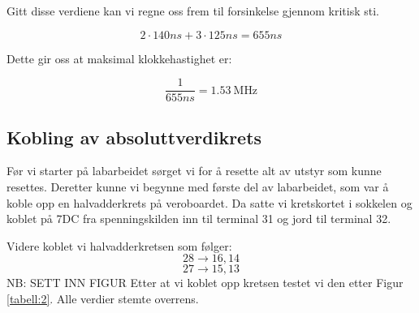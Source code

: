Gitt disse verdiene kan vi regne oss frem til forsinkelse gjennom kritisk sti.

\begin{displaymath}
  2 \cdot 140ns + 3 \cdot 125ns = 655ns
\end{displaymath}

Dette gir oss at maksimal klokkehastighet er:

\begin{displaymath}
  \frac{1}{655ns} = \SI{1.53}{\mega\hertz}
\end{displaymath}

\subsection{Kobling av absoluttverdikrets}

Før vi starter på labarbeidet sørget vi for å resette alt av utstyr som kunne resettes.
Deretter kunne vi begynne med første del av labarbeidet, som var å koble opp en halvadderkrets på veroboardet.
Da satte vi kretskortet i sokkelen og koblet på 7DC fra spenningskilden inn til terminal 31 og jord til terminal 32.

Videre koblet vi halvadderkretsen som følger:
\begin{displaymath}
  28 \rightarrow 16, 14
\end{displaymath}
\begin{displaymath}
  27 \rightarrow 15, 13
\end{displaymath}
NB: SETT INN FIGUR
Etter at vi koblet opp kretsen testet vi den etter Figur \ref{tabell:2}. Alle verdier stemte overrens.
